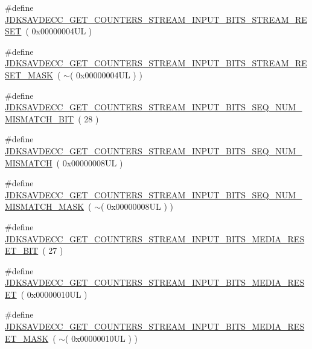 \begin{DoxyCompactItemize}
\item 
\#define \hyperlink{group__get__counters__stream__input__bits_ga9f47e634a7cf0fcddf2c3fbb30f1f10a}{J\+D\+K\+S\+A\+V\+D\+E\+C\+C\+\_\+\+G\+E\+T\+\_\+\+C\+O\+U\+N\+T\+E\+R\+S\+\_\+\+S\+T\+R\+E\+A\+M\+\_\+\+I\+N\+P\+U\+T\+\_\+\+B\+I\+T\+S\+\_\+\+S\+T\+R\+E\+A\+M\+\_\+\+R\+E\+S\+ET}~( 0x00000004\+U\+L )
\item 
\#define \hyperlink{group__get__counters__stream__input__bits_ga79fecc9a6600c8efbbf349f723b501f8}{J\+D\+K\+S\+A\+V\+D\+E\+C\+C\+\_\+\+G\+E\+T\+\_\+\+C\+O\+U\+N\+T\+E\+R\+S\+\_\+\+S\+T\+R\+E\+A\+M\+\_\+\+I\+N\+P\+U\+T\+\_\+\+B\+I\+T\+S\+\_\+\+S\+T\+R\+E\+A\+M\+\_\+\+R\+E\+S\+E\+T\+\_\+\+M\+A\+SK}~( $\sim$( 0x00000004\+U\+L ) )
\item 
\#define \hyperlink{group__get__counters__stream__input__bits_gaeb32fdec88203482640b1e1ed6a3d9ed}{J\+D\+K\+S\+A\+V\+D\+E\+C\+C\+\_\+\+G\+E\+T\+\_\+\+C\+O\+U\+N\+T\+E\+R\+S\+\_\+\+S\+T\+R\+E\+A\+M\+\_\+\+I\+N\+P\+U\+T\+\_\+\+B\+I\+T\+S\+\_\+\+S\+E\+Q\+\_\+\+N\+U\+M\+\_\+\+M\+I\+S\+M\+A\+T\+C\+H\+\_\+\+B\+IT}~( 28 )
\item 
\#define \hyperlink{group__get__counters__stream__input__bits_ga3e6a63202a5ce8644a7dfecc4442c031}{J\+D\+K\+S\+A\+V\+D\+E\+C\+C\+\_\+\+G\+E\+T\+\_\+\+C\+O\+U\+N\+T\+E\+R\+S\+\_\+\+S\+T\+R\+E\+A\+M\+\_\+\+I\+N\+P\+U\+T\+\_\+\+B\+I\+T\+S\+\_\+\+S\+E\+Q\+\_\+\+N\+U\+M\+\_\+\+M\+I\+S\+M\+A\+T\+CH}~( 0x00000008\+U\+L )
\item 
\#define \hyperlink{group__get__counters__stream__input__bits_gaadcb6455e51fa0e46cba36c98f069a30}{J\+D\+K\+S\+A\+V\+D\+E\+C\+C\+\_\+\+G\+E\+T\+\_\+\+C\+O\+U\+N\+T\+E\+R\+S\+\_\+\+S\+T\+R\+E\+A\+M\+\_\+\+I\+N\+P\+U\+T\+\_\+\+B\+I\+T\+S\+\_\+\+S\+E\+Q\+\_\+\+N\+U\+M\+\_\+\+M\+I\+S\+M\+A\+T\+C\+H\+\_\+\+M\+A\+SK}~( $\sim$( 0x00000008\+U\+L ) )
\item 
\#define \hyperlink{group__get__counters__stream__input__bits_gaf676e15237ca342517803760f594fda6}{J\+D\+K\+S\+A\+V\+D\+E\+C\+C\+\_\+\+G\+E\+T\+\_\+\+C\+O\+U\+N\+T\+E\+R\+S\+\_\+\+S\+T\+R\+E\+A\+M\+\_\+\+I\+N\+P\+U\+T\+\_\+\+B\+I\+T\+S\+\_\+\+M\+E\+D\+I\+A\+\_\+\+R\+E\+S\+E\+T\+\_\+\+B\+IT}~( 27 )
\item 
\#define \hyperlink{group__get__counters__stream__input__bits_ga34bce5d203ebb5b646e2b4fcf61b0170}{J\+D\+K\+S\+A\+V\+D\+E\+C\+C\+\_\+\+G\+E\+T\+\_\+\+C\+O\+U\+N\+T\+E\+R\+S\+\_\+\+S\+T\+R\+E\+A\+M\+\_\+\+I\+N\+P\+U\+T\+\_\+\+B\+I\+T\+S\+\_\+\+M\+E\+D\+I\+A\+\_\+\+R\+E\+S\+ET}~( 0x00000010\+U\+L )
\item 
\#define \hyperlink{group__get__counters__stream__input__bits_ga046da24cdd368d5371e72feffa9f2570}{J\+D\+K\+S\+A\+V\+D\+E\+C\+C\+\_\+\+G\+E\+T\+\_\+\+C\+O\+U\+N\+T\+E\+R\+S\+\_\+\+S\+T\+R\+E\+A\+M\+\_\+\+I\+N\+P\+U\+T\+\_\+\+B\+I\+T\+S\+\_\+\+M\+E\+D\+I\+A\+\_\+\+R\+E\+S\+E\+T\+\_\+\+M\+A\+SK}~( $\sim$( 0x00000010\+U\+L ) )

\end{DoxyCompactItemize}
